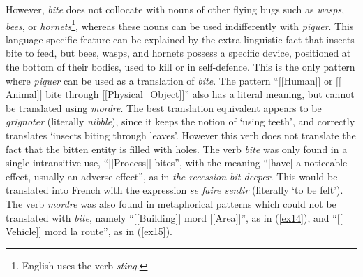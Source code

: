 \documentclass[output=paper]{langsci/langscibook}
\begin{document}
However, \textit{bite} does not collocate with nouns of other flying bugs such
as \textit{wasps}, \textit{bees}, or \textit{hornets}\footnote{ English uses the verb \textit{sting}.},
whereas these nouns can be used indifferently with \textit{piquer}. This
language-specific feature can be explained by the extra-linguistic fact
that insects bite to feed, but bees, wasps, and hornets possess a
specific device, positioned at the bottom of their bodies, used to kill
or in self-defence. This is the only pattern where \textit{piquer} can be used
as a translation of \textit{bite}. The pattern “$[$$[$Human$]$$]$ or $[$$[$Animal$]$$]$ bite
through $[$$[$Physical\_Object$]$$]$” also has a literal meaning, but cannot be
translated using \textit{mordre}. The best translation equivalent appears to
be \textit{grignoter} (literally \textit{nibble}), since it keeps the notion of
`using teeth', and correctly translates `insects biting through
leaves'. However this verb does not translate the fact that the bitten
entity is filled with holes. The verb \textit{bite} was only found in a single
intransitive use, “$[$$[$Process$]$$]$ bites”, with the meaning “$[$have$]$ a
noticeable effect, usually an adverse effect”, as in \textit{the recession bit
deeper}. This would be translated into French with the expression \textit{se
faire sentir} (literally `to be felt'). The verb \textit{mordre} was also
found in metaphorical patterns which could not be translated with
\textit{bite}, namely “$[$$[$Building$]$$]$ mord $[$$[$Area$]$$]$”, as in (\ref{ex14}), and
“$[$$[$Vehicle$]$$]$ mord la route”, as in (\ref{ex15}).




\end{document}
